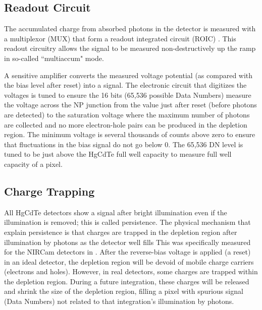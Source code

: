\documentclass[]{aastex62}
\begin{document}
\subsection{Readout Circuit}\label{sec:readout}

The accumulated charge from absorbed photons in the detector is measured with a multiplexor (MUX) that form a readout integrated circuit (ROIC) \citep{rieke2007irDetectorReview}.
This readout circuitry allows the signal to be measured non-destructively up the ramp in so-called ``multiaccum" mode.

A sensitive amplifier converts the measured voltage potential (as compared with the bias level after reset) into a signal.
The electronic circuit that digitizes the voltages is tuned to ensure the 16 bits (65,536 possible Data Numbers) measure the voltage across the NP junction from the value just after reset (before photons are detected) to the saturation voltage where the maximum number of photons are collected and no more electron-hole pairs can be produced in the depletion region.
The minimum voltage is several thousands of counts above zero to ensure that fluctuations in the bias signal do not go below 0.
The 65,536 DN level is tuned to be just above the HgCdTe full well capacity to measure full well capacity of a pixel.




\subsection{Charge Trapping}
All HgCdTe detectors show a signal after bright illumination even if the illumination is removed; this is called persistence.
The physical mechanism that explain persistence is that charges are trapped in the depletion region after illumination by photons as the detector well fills \citep{smith2008imgPersistence}
This was specifically measured for the NIRCam detectors in \citet{leisenring2016persistence}.
After the reverse-bias voltage is applied (a reset) in an ideal detector, the depletion region will be devoid of mobile charge carriers (electrons and holes).
However, in real detectors, some charges are trapped within the depletion region.
During a future integration, these charges will be released and shrink the size of the depletion region, filling a pixel with spurious signal (Data Numbers) not related to that integration's illumination by photons.
\end{document}
